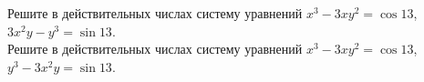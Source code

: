 
\problem
\sbp
Решите в действительных числах систему уравнений
$x^3 - 3 x y^2 = \cos 13$, $3 x^2 y - y^3 = \sin 13$.
\\
\sbp
Решите в действительных числах систему уравнений
$x^3 - 3 x y^2 = \cos 13$, $y^3 - 3 x^2 y = \sin 13$.

